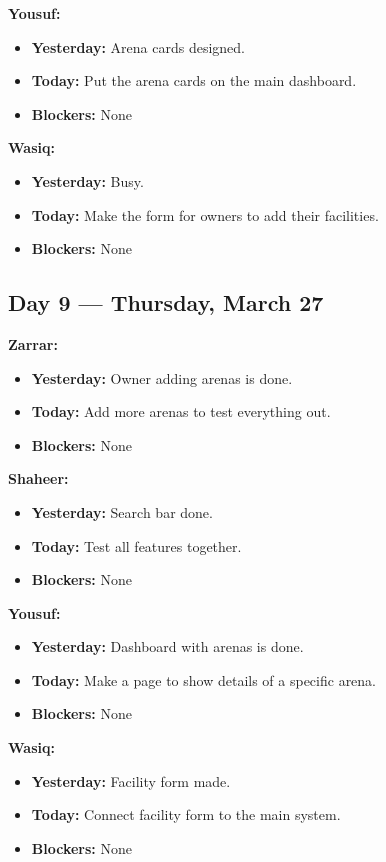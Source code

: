 \documentclass[12pt,a4paper]{article}
\begin{document}
\textbf{Yousuf:}
\begin{itemize}[noitemsep]
    \item \textbf{Yesterday:} Arena cards designed.
    \item \textbf{Today:} Put the arena cards on the main dashboard.
    \item \textbf{Blockers:} None
\end{itemize}

\textbf{Wasiq:}
\begin{itemize}[noitemsep]
    \item \textbf{Yesterday:} Busy.
    \item \textbf{Today:} Make the form for owners to add their facilities.
    \item \textbf{Blockers:} None
\end{itemize}

\newpage

\subsection*{Day 9 --- Thursday, March 27}

\textbf{Zarrar:}
\begin{itemize}[noitemsep]
    \item \textbf{Yesterday:} Owner adding arenas is done.
    \item \textbf{Today:} Add more arenas to test everything out.
    \item \textbf{Blockers:} None
\end{itemize}

\textbf{Shaheer:}
\begin{itemize}[noitemsep]
    \item \textbf{Yesterday:} Search bar done.
    \item \textbf{Today:} Test all features together.
    \item \textbf{Blockers:} None
\end{itemize}

\textbf{Yousuf:}
\begin{itemize}[noitemsep]
    \item \textbf{Yesterday:} Dashboard with arenas is done.
    \item \textbf{Today:} Make a page to show details of a specific arena.
    \item \textbf{Blockers:} None
\end{itemize}

\textbf{Wasiq:}
\begin{itemize}[noitemsep]
    \item \textbf{Yesterday:} Facility form made.
    \item \textbf{Today:} Connect facility form to the main system.
    \item \textbf{Blockers:} None
\end{itemize}
\end{document}
